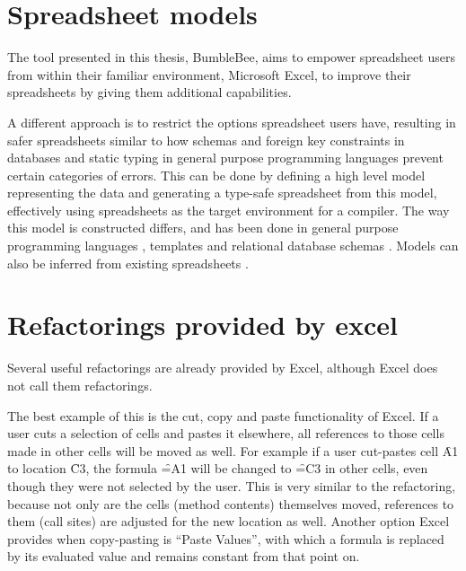 \section{Spreadsheet models}

The tool presented in this thesis, BumbleBee, aims to empower spreadsheet users from within their familiar environment, Microsoft Excel, to improve their spreadsheets by giving them additional capabilities.

A different approach is to restrict the options spreadsheet users have, resulting in safer spreadsheets similar to how schemas and foreign key constraints in databases and static typing in general purpose programming languages prevent certain categories of errors.
This can be done by defining a high level model representing the data and generating a type-safe spreadsheet from this model, effectively using spreadsheets as the target environment for a compiler.
The way this model is constructed differs, and has been done in general purpose programming languages \cite{paine2001ensuring, paine2006rapid}, templates \cite{engels2005classsheets, erwig2006gencel, bals2007classsheets, cunha2011type, cunha2011embedding, cunha2014model} and relational database schemas \cite{cunha2009spreadsheets}.
Models can also be inferred from existing spreadsheets \cite{abraham2006inferring,cunha2010automatically}.

\section{Refactorings provided by excel}

Several useful refactorings are already provided by Excel, although Excel does not call them refactorings.

The best example of this is the cut, copy and paste functionality of Excel.
If a user cuts a selection of cells and pastes it elsewhere, all references to those cells made in other cells will be moved as well.
For example if a user cut-pastes cell \f{A1} to location \f{C3}, the formula \f{=A1} will be changed to \f{=C3} in other cells, even though they were not selected by the user.
This is very similar to the  \cite{fowler1999refactoring} refactoring, because not only are the cells (method contents) themselves moved, references to them (call sites) are adjusted for the new location as well.
Another option Excel provides when copy-pasting is ``Paste Values'', with which a formula is replaced by its evaluated value and remains constant from that point on.

